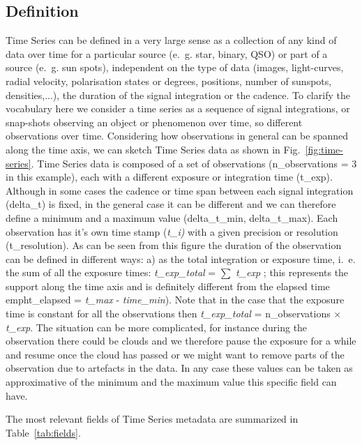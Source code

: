 \documentclass[11pt,a4paper]{ivoa}
\begin{document}
\subsection{Definition}
Time Series can be defined in a very large sense as a collection of any kind of data over time for a particular source (e.~g. star, binary, QSO) or part of a source (e.~g. sun spots), independent on the type of data (images, light-curves, radial velocity, polarisation states or degrees, positions, number of sunspots, densities,...), the duration of the signal integration or the cadence.
To clarify the vocabulary here we consider a time series as a sequence of signal integrations, or snap-shots observing  an object or phenomenon over time, so different observations over time.
Considering how observations in general can be spanned along the time axis, we can sketch Time Series data as shown in Fig.~\ref{fig:time-series}. Time Series data is composed of a set of observations (n\_observations = 3 in this example), each with a different exposure or integration time (t\_exp). Although in some cases the cadence or time span between each signal integration (delta\_t) is fixed, in the general case it can be different and we can therefore define a minimum and a maximum value (delta\_t\_min, delta\_t\_max). Each observation has it's own time stamp (\emph{t\_i)} with a given precision or resolution (t\_resolution). As can be seen from this figure the duration of the observation can be defined in different ways: a) as the total integration or exposure time, i.~e. the sum of all the exposure times: \emph{t\_exp\_total }= $\sum$ \emph{t\_exp} ; this represents the support along the time axis and is definitely different from  the elapsed time  emph{t\_elapsed} = \emph{t\_max} - \emph{time\_min}). Note that in the case that the exposure time is constant for all the observations then \emph{t\_exp\_total }= n\_observations $\times$ \emph{t\_exp}. The situation can be more complicated, for instance during the observation there could be clouds and we therefore pause the exposure for a while and resume once the cloud has passed or we might want to remove parts of the observation due to artefacts in the data. In any case these values can be taken as approximative of the minimum and the maximum value this specific field can have.

The most relevant fields of Time Series metadata are summarized in Table~\ref{tab:fields}.
\end{document}
